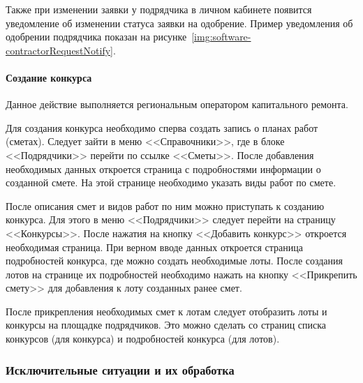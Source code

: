 
Также при изменении заявки у подрядчика в личном кабинете появится уведомление об изменении статуса заявки на одобрение.
Пример уведомления об одобрении подрядчика показан на рисунке~\ref{img:software-contractorRequestNotify}.


\paragraph{Создание конкурса}

Данное действие выполняется региональным оператором капитального ремонта.

Для создания конкурса необходимо сперва создать запись о планах работ (сметах).
Следует зайти в меню <<Справочники>>, где в блоке <<Подрядчики>> перейти по ссылке <<Сметы>>.
После добавления необходимых данных откроется страница с подробностями информации о созданной смете.
На этой странице необходимо указать виды работ по смете.

После описания смет и видов работ по ним можно приступать к созданию конкурса.
Для этого в меню <<Подрядчики>> следует перейти на страницу <<Конкурсы>>.
После нажатия на кнопку <<Добавить конкурс>> откроется необходимая страница.
При верном вводе данных откроется страница подробностей конкурса, где можно создать необходимые лоты.
После создания лотов на странице их подробностей необходимо нажать на кнопку <<Прикрепить смету>> для добавления к лоту созданных ранее смет.

После прикрепления необходимых смет к лотам следует отобразить лоты и конкурсы на площадке подрядчиков.
Это можно сделать со страниц списка конкурсов (для конкурса) и подробностей конкурса (для лотов).


\subsubsection{Исключительные ситуации и их обработка}

